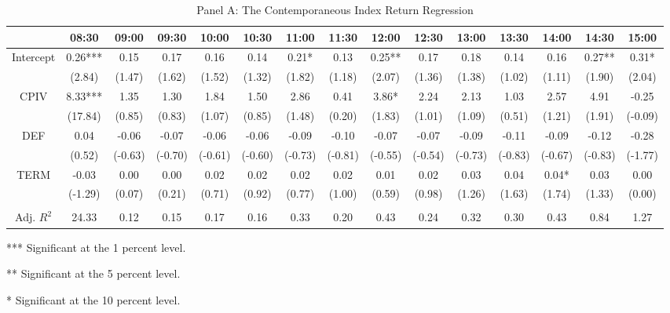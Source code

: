 \begin{table}[h]
\begin{threeparttable}
\begin{subtable}[t]{\linewidth}
\caption{Panel A: The Contemporaneous Index Return Regression }
\tiny
\begin{tabular}{ccccccccccccccc}
\toprule
	& 08:30   & 09:00   & 09:30   & 10:00   & 10:30   & 11:00   & 11:30   & 12:00   & 12:30   & 13:00   & 13:30   & 14:00   & 14:30   & 15:00   \\ \midrule
Intercept & 0.26*** & 0.15    & 0.17    & 0.16    & 0.14    & 0.21*   & 0.13    & 0.25**  & 0.17    & 0.18    & 0.14    & 0.16    & 0.27**  & 0.31*   \\
      & (2.84)  & (1.47)  & (1.62)  & (1.52)  & (1.32)  & (1.82)  & (1.18)  & (2.07)  & (1.36)  & (1.38)  & (1.02)  & (1.11)  & (1.90)  & (2.04)  \\
CPIV      & 8.33*** & 1.35    & 1.30    & 1.84    & 1.50    & 2.86    & 0.41    & 3.86*   & 2.24    & 2.13    & 1.03    & 2.57    & 4.91    & -0.25   \\
      & (17.84) & (0.85)  & (0.83)  & (1.07)  & (0.85)  & (1.48)  & (0.20)  & (1.83)  & (1.01)  & (1.09)  & (0.51)  & (1.21)  & (1.91)  & (-0.09) \\
DEF       & 0.04    & -0.06   & -0.07   & -0.06   & -0.06   & -0.09   & -0.10   & -0.07   & -0.07   & -0.09   & -0.11   & -0.09   & -0.12   & -0.28   \\
      & (0.52)  & (-0.63) & (-0.70) & (-0.61) & (-0.60) & (-0.73) & (-0.81) & (-0.55) & (-0.54) & (-0.73) & (-0.83) & (-0.67) & (-0.83) & (-1.77) \\
TERM      & -0.03   & 0.00    & 0.00    & 0.02    & 0.02    & 0.02    & 0.02    & 0.01    & 0.02    & 0.03    & 0.04    & 0.04*   & 0.03    & 0.00    \\
      & (-1.29) & (0.07)  & (0.21)  & (0.71)  & (0.92)  & (0.77)  & (1.00)  & (0.59)  & (0.98)  & (1.26)  & (1.63)  & (1.74)  & (1.33)  & (0.00)  \\
      &         &         &         &         &         &         &         &         &         &         &         &         &         &         \\
Adj. $R^{2}$    & 24.33   & 0.12    & 0.15    & 0.17    & 0.16    & 0.33    & 0.20    & 0.43    & 0.24    & 0.32    & 0.30    & 0.43    & 0.84    & 1.27  \\
\bottomrule
\end{tabular}

\begin{tablenotes}
\item
\item[***]Significant at the 1 percent level.    
\item[**]Significant at the 5 percent level.   
\item[*]Significant at the 10 percent level.
\end{tablenotes}
\end{subtable}


\end{threeparttable}
\end{table}
